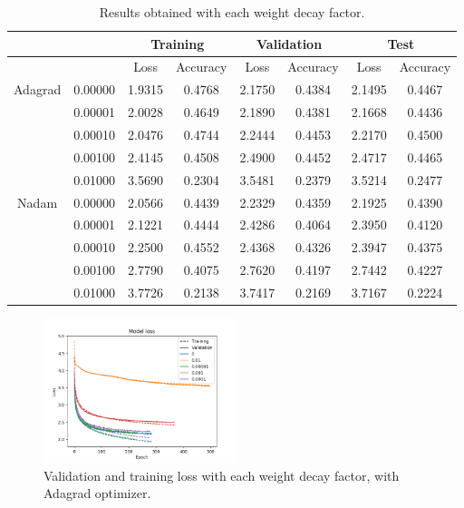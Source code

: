 \documentclass[]{article}
\begin{document}
\begin{table}[H]
	\centering
	\label{t:ker2}
	\begin{tabular}{@{}cccccccc@{}}
		\toprule
		&         & \multicolumn{2}{c}{Training} & \multicolumn{2}{c}{Validation} & \multicolumn{2}{c}{Test} \\ \midrule
		&         & Loss         & Accuracy      & Loss          & Accuracy       & Loss       & Accuracy    \\
		\midrule
		Adagrad & 0.00000 & 1.9315       & 0.4768        & 2.1750        & 0.4384         & 2.1495     & 0.4467      \\
		& 0.00001 & 2.0028       & 0.4649        & 2.1890        & 0.4381         & 2.1668     & 0.4436      \\
		& 0.00010 & 2.0476       & 0.4744        & 2.2444        & 0.4453         & 2.2170     & 0.4500      \\
		& 0.00100 & 2.4145       & 0.4508        & 2.4900        & 0.4452         & 2.4717     & 0.4465      \\
		& 0.01000 & 3.5690       & 0.2304        & 3.5481        & 0.2379         & 3.5214     & 0.2477      \\
		\midrule
		Nadam   & 0.00000 & 2.0566       & 0.4439        & 2.2329        & 0.4359         & 2.1925     & 0.4390      \\
		& 0.00001 & 2.1221       & 0.4444        & 2.4286        & 0.4064         & 2.3950     & 0.4120      \\
		& 0.00010 & 2.2500       & 0.4552        & 2.4368        & 0.4326         & 2.3947     & 0.4375      \\
		& 0.00100 & 2.7790       & 0.4075        & 2.7620        & 0.4197         & 2.7442     & 0.4227      \\
		& 0.01000 & 3.7726       & 0.2138        & 3.7417        & 0.2169         & 3.7167     & 0.2224      \\ \bottomrule
	\end{tabular}
	\caption{Results obtained with each weight decay factor.}
\end{table}

\begin{figure}[H]
	\centering
	\includegraphics[width=0.5\textwidth]{weight2_adagrad_loss}
	\caption{Validation and training loss with each weight decay factor, with Adagrad optimizer.}
	\label{f:ker5}
\end{figure}
\end{document}
